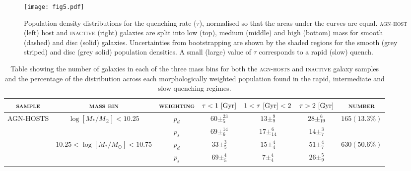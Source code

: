 \documentclass[useAMS,usenatbib]{mn2e}
\def\secondchange    {\color{srv} }
\def\newref    {\color{new} }
\begin{document}
\begin{figure*}
\texttt{[image: fig5.pdf]}
\caption{{\secondchange Population density} distributions for the quenching rate ($\tau$), normalised so that the areas under the curves are equal. \textsc{agn-host} (left) host and \textsc{inactive} (right) galaxies are split into low (top), medium (middle) and high (bottom) mass for smooth (dashed) and disc (solid) galaxies. {\newref Uncertainties from bootstrapping are shown by the shaded regions for the smooth (grey striped) and disc (grey solid) population densities.} A small (large) value of $\tau$ corresponds to a rapid (slow) quench.}
\label{rate}
\end{figure*}

\begin{table*}
\centering
\caption{Table showing the number of galaxies in each of the three mass bins for both the \textsc{agn-hosts} and \textsc{inactive} galaxy samples and the percentage of the {\secondchange distribution} across each morphologically weighted population found in the rapid, intermediate and slow quenching regimes.}
\label{massbins}
\begin{tabular}{c|c|c|c|c|c|c}
\hline
\textsc{sample}                     & \textsc{mass bin}                                        & \textsc{weighting}                  & $\tau < 1 ~\rm{[Gyr]}$                             & $1 < \tau ~\rm{[Gyr]} < 2 $          & $\tau > 2 ~\rm{[Gyr]}$                               & \textsc{number}                                        \\ \hline \hline
\multirow{6}{*}{AGN-HOSTS} & \multirow{2}{*}{$\log [M_*/M_{\odot}] < 10.25 $}                       & $p_d$     & $60\pm_{5}^{23}$                    & $13\pm_{9}^{9}$                    & $28\pm_{19}^{6}$       & \multirow{2}{*}{$165 (13.3\%)$}                      \\
                           &                                                 & $p_s$     & $69\pm_{6}^{14}$                    & $17\pm_{14}^{6}$                   & $14\pm_{7}^{3}$        &                                                      \\ \cline{2-7} 
                           & \multirow{2}{*}{$10.25 < \log [M_*/M_{\odot}] < 10.75$}                    & $p_d$     & $33\pm_{5}^{3}$                     & $15\pm_{4}^{4}$                    & $51\pm_{7}^{4}$        & \multirow{2}{*}{$630 (50.6\%)$}                      \\
                           &                                                 & $p_s$     & $69\pm_{5}^{4}$                     & $7\pm_{4}^{4}$                     & $26\pm_{9}^{5}$        &                                                      \\ \cline{2-7} 

\end{tabular}
\end{table*}
\end{document}
